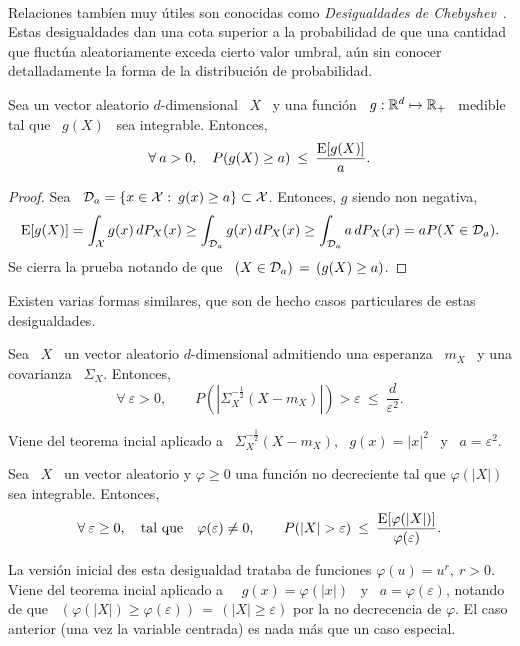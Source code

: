 \

Relaciones  tamb\'ien muy  \'utiles  son conocidas  como  {\it Desigualdades  de
  Chebyshev}~\cite{Bie53,  Tch67,  Mar84,  OlkPra58,  Fer82,  Nav13,  StePar17}.
Estas desigualdades dan una cota superior  a la probabilidad de que una cantidad
que  fluct\'ua aleatoriamente  exceda  cierto valor  umbral,  a\'un sin  conocer
detalladamente la forma de la distribuci\'on de probabilidad.
%
\begin{teorema}
\label{Teo:MP:Chebyshev}
%
  Sea un vector aleatorio $d$-dimensional \  $X$ \ y una funci\'on \ $g: \mathbb{R}^d
  \mapsto \mathbb{R}_+$ \ medible tal que \ $g(X)$ \ sea integrable. Entonces,
  \[
  \forall \: a > 0, \quad P(g(X) \ge a) \: \le \: \frac{\operatorname{E}[g(X)]}{a}.
  \]
\end{teorema}
%
\begin{proof}
  Sea \ $\mathcal{D}_a = \{ x \in \mathcal{X}:  \: g(x) \ge a \} \subset \mathcal{X}$. Entonces, $g$ siendo
  non negativa,
  \[
  \operatorname{E}[g(X)]  = \int_{\mathcal{X}}  g(x) \,  dP_X(x) \ge  \int_{\mathcal{D}_a} g(x)  \,  dP_X(x) \ge
  \int_{\mathcal{D}_a} a \, dP_X(x) = a P(X \in \mathcal{D}_a).
  \]
  Se cierra la prueba notando de que \ $(X \in \mathcal{D}_a) \, = \, (g(X) \ge a)$.
\end{proof}
%
Existen varias  formas similares, que son  de hecho casos  particulares de estas
desigualdades.
%
\begin{corolario}
\label{Cor:MP:BienaymeChebyshev}
%
  Sea \  $X$ \  un vector aleatorio  $d$-dimensional admitiendo una  esperanza \
  $m_X$ \ y una covarianza \ $\Sigma_X$. Entonces,
  \[
  \forall \:  \varepsilon > 0,  \qquad P\left( \left| \Sigma_X^{-\frac12}  (X -
      m_X) \right| \right) > \varepsilon \: \le \: \frac{d}{\varepsilon^2}.
 \]
\end{corolario}
%
Viene del teorema incial aplicado a \ $\Sigma_X^{-\frac12} (X - m_X)$, \ $g(x)
= |x|^2$ \ y \ $a = \varepsilon^2$.
%
%
\begin{corolario}[Markov]
\label{Cor:MP:Markov}
%
  Sea \ $X$ \ un vector aleatorio y $\varphi \ge 0$ una funci\'on no decreciente
  tal que $\varphi(|X|)$ sea integrable. Entonces,
  \[
  \forall \: \varepsilon \ge  0, \quad \mbox{tal que} \quad \varphi(\varepsilon)
  \ne     0,     \qquad     P(|X|     >     \varepsilon)     \:     \le     \:
  \frac{\operatorname{E}[\varphi(|X|)]}{\varphi(\varepsilon)}.
 \]
\end{corolario}
%
La versi\'on  inicial des  esta desigualdad trataba  de funciones  $\varphi(u) =
u^r, \: r > 0$. Viene del teorema  incial aplicado a \ \ $g(x) = \varphi(|x|)$ \
y  \   $a  =  \varphi(\varepsilon)$,   notando  de  que  \   $(\varphi(|X|)  \ge
\varphi(\varepsilon)) \,  = \, (|X| \ge  \varepsilon)$ por la  no decrecencia de
$\varphi$. El caso anterior (una vez  la variable centrada) es nada m\'as que un
caso especial.

